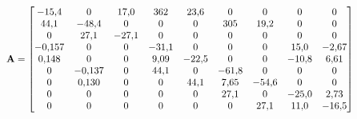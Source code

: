 \begin{equation}
  \label{eq:matriz_A}
  \resizebox{0.9\linewidth}{!}{$\displaystyle \mathbf{A} = \begin{bmatrix}
-15{,}4 & 0 & 17{,}0 & 362 & 23{,}6 & 0 & 0 & 0 & 0 \\
44{,}1 & -48{,}4 & 0 & 0 & 0 & 305 & 19{,}2 & 0 & 0 \\
0 & 27{,}1 & -27{,}1 & 0 & 0 & 0 & 0 & 0 & 0 \\
-0{,}157 & 0 & 0 & -31{,}1 & 0 & 0 & 0 & 15{,}0 & -2{,}67 \\
0{,}148 & 0 & 0 & 9{,}09 & -22{,}5 & 0 & 0 & -10{,}8 & 6{,}61 \\
0 & -0{,}137 & 0 & 44{,}1 & 0 & -61{,}8 & 0 & 0 & 0 \\
0 & 0{,}130 & 0 & 0 & 44{,}1 & 7{,}65 & -54{,}6 & 0 & 0 \\
0 & 0 & 0 & 0 & 0 & 27{,}1 & 0 & -25{,}0 & 2{,}73 \\
0 & 0 & 0 & 0 & 0 & 0 & 27{,}1 & 11{,}0 & -16{,}5
\end{bmatrix}$}
\end{equation}
